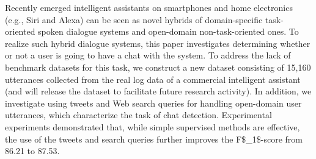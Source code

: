 Recently emerged intelligent assistants on smartphones and home electronics (e.g., Siri and Alexa) can be seen as novel hybrids of domain-specific task-oriented spoken dialogue systems and open-domain non-task-oriented ones. To realize such hybrid dialogue systems, this paper investigates determining whether or not a user is going to have a chat with the system. To address the lack of benchmark datasets for this task, we construct a new dataset consisting of 15,160 utterances collected from the real log data of a commercial intelligent assistant (and will release the dataset to facilitate future research activity). In addition, we investigate using tweets and Web search queries for handling open-domain user utterances, which characterize the task of chat detection. Experimental experiments demonstrated that, while simple supervised methods are effective, the use of the tweets and search queries further improves the F\$\_1\$-score from 86.21 to 87.53.
